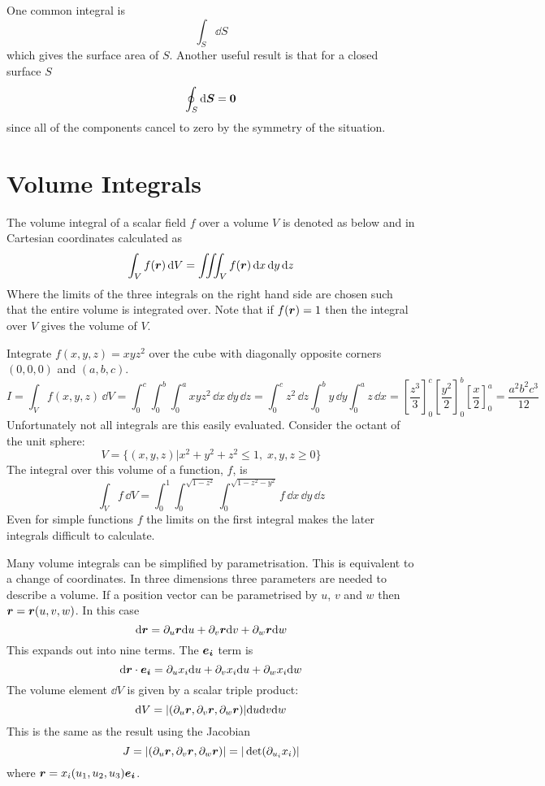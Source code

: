 \documentclass{article}
\begin{document}
    One common integral is
    \[\int_S\dd S\]
    which gives the surface area of \(S\).
    Another useful result is that for a closed surface \(S\)
    \[\oint_S\dd\bm{S} = \bm{0}\]
    since all of the components cancel to zero by the symmetry of the situation.
    
    \section{Volume Integrals}
    The volume integral of a scalar field \(f\) over a volume \(V\) is denoted as below and in Cartesian coordinates calculated as
    \[\int_V f(\bm{r})\,\dd V = \iiint_V f(\bm{r})\,\dd x\,\dd y\,\dd z\]
    Where the limits of the three integrals on the right hand side are chosen such that the entire volume is integrated over.
    Note that if \(f(\bm{r}) = 1\) then the integral over \(V\) gives the volume of \(V\).
    
    \example
    Integrate \(f(x, y, z) = xyz^2\) over the cube with diagonally opposite corners \((0, 0, 0)\) and \((a, b, c)\).
    \[I = \int_V f(x, y, z)\,\dd V = \int_0^c\int_0^b\int_0^a xyz^2\,\dd x\,\dd y\,\dd z = \int_0^c z^2\,\dd z\int_0^b y\,\dd y\int_0^a z\,\dd x = \left[\frac{z^3}{3}\right]_0^c\left[\frac{y^2}{2}\right]_0^b\left[\frac{x}{2}\right]_0^a = \frac{a^2b^2c^3}{12}\]
    Unfortunately not all integrals are this easily evaluated.
    Consider the octant of the unit sphere:
    \[V = \{(x, y, z)|x^2+y^2+z^2 \le 1,\; x, y, z\ge 0\}\]
    The integral over this volume of a function, \(f\), is
    \[\int_V f\,\dd V = \int_0^1\int_0^{\sqrt{1 - z^2}}\int_0^{\sqrt{1 - z^2 - y^2}}f\,\dd x\,\dd y\,\dd z\]
    Even for simple functions \(f\) the limits on the first integral makes the later integrals difficult to calculate.
    
    Many volume integrals can be simplified by parametrisation.
    This is equivalent to a change of coordinates.
    In three dimensions three parameters are needed to describe a volume.
    If a position vector can be parametrised by \(u\), \(v\) and \(w\) then \(\bm{r} = \bm{r}(u, v, w)\).
    In this case
    \[\dd\bm{r} = \partial_u\bm{r}\dd u + \partial_v\bm{r}\dd v + \partial_w\bm{r}\dd w\]
    This expands out into nine terms.
    The \(\bm{e_{i}}\) term is
    \[\dd\bm{r}\cdot\bm{e_{i}} = \partial_u x_i\dd u + \partial_v x_i\dd u + \partial_w x_i\dd w\]
    The volume element \(\dd V\) is given by a scalar triple product:
    \[\dd V = |(\partial_u\bm{r}, \partial_v\bm{r}, \partial_w\bm{r})|\dd u\dd v\dd w\]
    This is the same as the result using the Jacobian
    \[J = |(\partial_u\bm{r}, \partial_v\bm{r}, \partial_w\bm{r})| = |\det(\partial_{u_i}x_i)|\]
    where \(\bm{r} = x_i(u_1, u_2, u_3)\bm{e_{i}}\).
    
\end{document}
